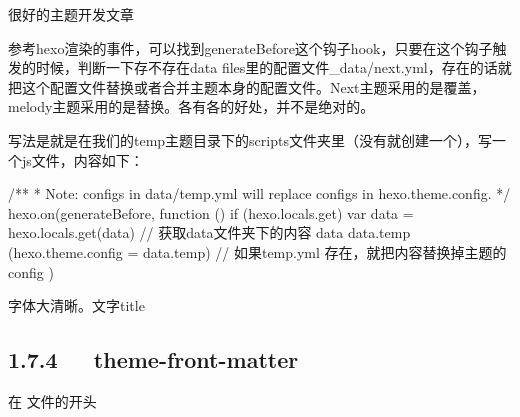 \documentclass[letterpaper,12pt,english]{sphinxmanual}
\begin{document}
\begin{description}
\item[{}] \leavevmode
{}

\end{description}


很好的主题开发文章


参考hexo渲染的事件，可以找到generateBefore这个钩子hook，只要在这个钩子触发的时候，判断一下存不存在data files里的配置文件\_data/next.yml，存在的话就把这个配置文件替换或者合并主题本身的配置文件。Next主题采用的是覆盖，melody主题采用的是替换。各有各的好处，并不是绝对的。

写法是就是在我们的temp主题目录下的scripts文件夹里（没有就创建一个），写一个js文件，内容如下：

\begin{sphinxVerbatim}[commandchars=\\\{\}]
/**
 * Note: configs in \PYGZus{}data/temp.yml will replace configs in   hexo.theme.config.
 */
hexo.on(\PYGZsq{}generateBefore\PYGZsq{}, function () \PYGZob{}
  if (hexo.locals.get) \PYGZob{}
    var data = hexo.locals.get(\PYGZsq{}data\PYGZsq{}) // 获取\PYGZus{}data文件夹下的内容
    data \PYGZam{}\PYGZam{} data.temp \PYGZam{}\PYGZam{} (hexo.theme.config = data.temp) // 如果temp.yml   存在，就把内容替换掉主题的config
  \PYGZcb{}
\PYGZcb{})
\end{sphinxVerbatim}


字体大清晰。文字title



\subsection{1.7.4   theme-front-matter}
\label{\detokenize{001software/001install/001._u7f51_u7ad9/hexo:theme-front-matter}}
在  文件的开头
\end{document}
